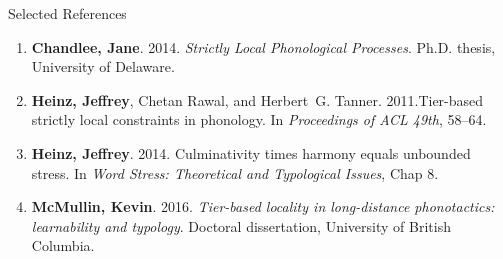 \documentclass[xcolor={usenames,svgnames,x11names,table}]{beamer}
\begin{document}
\begin{frame}[plain]{Selected References}
%
%

        \begin{enumerate}%
        
        \item \textbf{Chandlee, Jane}. 2014. {\em Strictly Local Phonological Processes}. Ph.D. thesis, University of Delaware.
        \item \textbf{Heinz, Jeffrey}, Chetan Rawal, and Herbert~G. Tanner. 2011.Tier-based strictly local constraints in phonology. In {\em Proceedings of ACL 49th\/}, 58--64.
        \item \textbf{Heinz, Jeffrey}. 2014. Culminativity times harmony equals unbounded stress. In \textit{Word Stress: Theoretical and Typological Issues}, Chap 8.
        \item \textbf{McMullin, Kevin}. 2016.  \textit{Tier-based locality in long-distance phonotactics: learnability and typology}. Doctoral  dissertation, University of British Columbia.
        
        \end{enumerate}

\end{frame}
\end{document}
